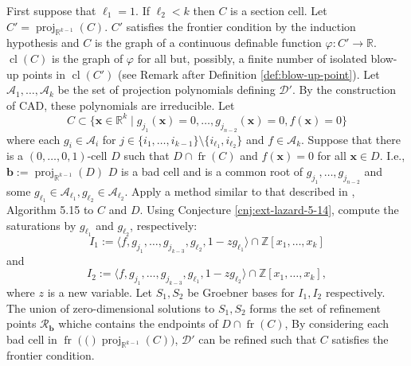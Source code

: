 \documentclass[
]{book}
\theoremstyle{definition}
\theoremstyle{definition}
\theoremstyle{definition}
\theoremstyle{definition}
\theoremstyle{remark}
\begin{document}
First suppose that \(\ell_1 = 1\). If \(\ell_2 < k\) then \(C\) is a section cell.
Let \(C' = {\operatorname{proj}_{\mathbb{R}^{k-1}}}(C)\). \(C'\) satisfies the frontier condition by the induction hypothesis and \(C\) is the graph of a continuous definable function \(\varphi : C' \to \mathbb{R}\).
\({\operatorname{cl} \left( C \right)}\) is the graph of \(\varphi\) for all but, possibly, a finite number of isolated blow-up points in \({\operatorname{cl} \left( C' \right)}\) (see Remark after Definition \ref{def:blow-up-point}).
Let \(\mathcal{A}_1,\ldots,\mathcal{A}_k\) be the set of projection polynomials defining \(\mathcal{D'}\). By the construction of CAD, these polynomials are irreducible. Let
\[
C \subset \{ \mathbf{x} \in \mathbb{R}^k \mid g_{j_1}(\mathbf{x}) = 0, \ldots, g_{j_{n-2}}(\mathbf{x}) = 0, f(\mathbf{x}) = 0 \}
\]
where each \(g_i \in \mathcal{A}_i\) for \(j \in \{i_1,\ldots,i_{k-1}\} \setminus \{i_{\ell_1}, i_{\ell_2} \}\) and \(f \in \mathcal{A}_k\).
Suppose that there is a \((0,\ldots,0,1)\)-cell \(D\) such that \(D \cap {\operatorname{fr} \left( C \right)}\) and \(f(\mathbf{x}) = 0\) for all \(\mathbf{x} \in D\). I.e., \(\mathbf{b} := {\operatorname{proj}_{\mathbb{R}^{k-1}}}(D)\) \(D\) is a bad cell and is a common root of \(g_{j_1}, \ldots, g_{j_{n-2}}\) and some \(g_{\ell_1} \in \mathcal{A}_{\ell_1}, g_{\ell_2} \in \mathcal{A}_{\ell_2}\).
Apply a method similar to that described in \citet{lazard10}, Algorithm 5.15 to \(C\) and \(D\). Using Conjecture \ref{cnj:ext-lazard-5-14}, compute the saturations by \(g_{\ell_1}\) and \(g_{\ell_2}\), respectively:
\begin{equation}
I_1 := \langle f, g_{j_1}, \ldots, g_{j_{k-3}}, g_{\ell_2}, 1 - z g_{\ell_1} \rangle \cap \mathbb{Z}[x_1,\ldots,x_k]
\label{eq:lazard-n-1}
\end{equation}
and
\begin{equation}
I_2 := \langle f, g_{j_1}, \ldots, g_{j_{k-3}}, g_{\ell_1}, 1 - z g_{\ell_2} \rangle \cap \mathbb{Z}[x_1,\ldots,x_k],
\label{eq:lazard-n-2}
\end{equation}
where \(z\) is a new variable.
Let \(S_1, S_2\) be Groebner bases for \(I_1,I_2\) respectively. The union of zero-dimensional solutions to \(S_1,S_2\) forms the set of refinement points \(\mathcal{R}_\mathbf{b}\) whiche contains the endpoints of \(D \cap {\operatorname{fr} \left( C \right)}\), By considering each bad cell in \({\operatorname{fr} \left( ( \right)}{\operatorname{proj}_{\mathbb{R}^{k-1}}}(C))\), \(\mathcal{D}'\) can be refined such that \(C\) satisfies the frontier condition.
\end{document}
